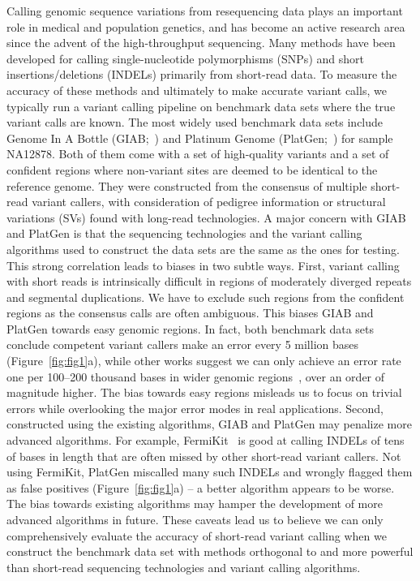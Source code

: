\documentclass{bioinfo}
\begin{document}
Calling genomic sequence variations from resequencing data plays an important
role in medical and population genetics, and has become an active research area
since the advent of the high-throughput sequencing. Many methods have been
developed for calling single-nucleotide polymorphisms (SNPs) and short
insertions/deletions (INDELs) primarily from short-read data. To measure the
accuracy of these methods and ultimately to make accurate variant calls, we
typically run a variant calling pipeline on benchmark data sets where the true
variant calls are known. The most widely used benchmark data sets include
Genome In A Bottle (GIAB;~\citealp{Zook:2014ab}) and Platinum Genome
(PlatGen;~\citealp{Eberle055541}) for sample NA12878. Both of them come with a set of high-quality
variants and a set of confident regions where non-variant sites are deemed to
be identical to the reference genome. They were constructed from the consensus
of multiple short-read variant callers, with consideration of pedigree
information or structural variations (SVs) found with long-read technologies. A major
concern with GIAB and PlatGen is that the sequencing technologies and the
variant calling algorithms used to construct the data sets are the same as the
ones for testing. This strong correlation leads to biases in two subtle ways.
First, variant calling with short reads is intrinsically difficult in regions
of moderately diverged repeats and segmental duplications.  We have to exclude
such regions from the confident regions as the consensus calls are often
ambiguous. This biases GIAB and PlatGen towards easy genomic regions. In fact,
both benchmark data sets conclude competent variant callers make an error every
5 million bases (Figure~\ref{fig:fig1}a), while other works suggest we can only
achieve an error rate one per 100--200 thousand bases in wider genomic
regions~\citep{Nickles:2012aa,Li:2014ac}, over an order of magnitude higher.
The bias towards easy regions misleads us to focus on trivial errors while
overlooking the major error modes in real applications. Second, constructed
using the existing algorithms, GIAB and PlatGen may penalize more advanced
algorithms. For example, FermiKit~\citep{Li:2015eu} is good at calling INDELs
of tens of bases in length that are often missed by other short-read variant
callers. Not using FermiKit, PlatGen miscalled many such INDELs and wrongly
flagged them as false positives (Figure~\ref{fig:fig1}a) -- a better algorithm
appears to be worse. The bias towards existing algorithms may hamper the
development of more advanced algorithms in future. These caveats lead us to
believe we can only comprehensively evaluate the accuracy of short-read variant
calling when we construct the benchmark data set with methods orthogonal to and
more powerful than short-read sequencing technologies and variant calling
algorithms.
\end{document}
